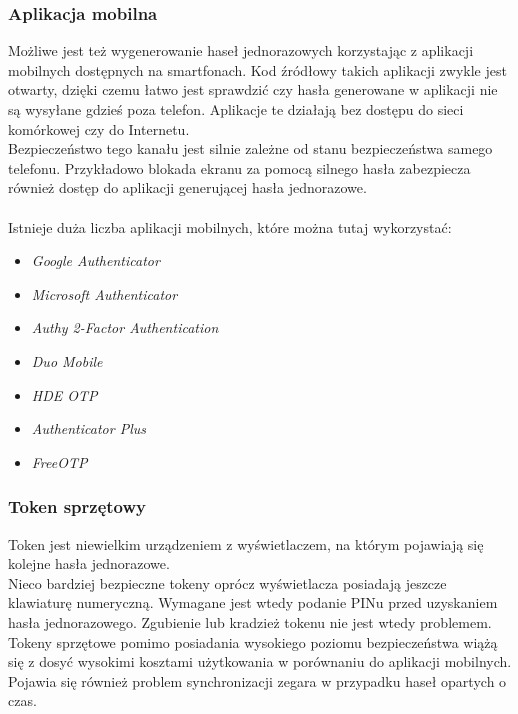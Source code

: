 \subsubsection{Aplikacja mobilna}
Możliwe jest też wygenerowanie haseł jednorazowych korzystając z aplikacji mobilnych 
dostępnych na smartfonach. Kod źródłowy takich aplikacji zwykle jest otwarty, dzięki czemu 
łatwo jest sprawdzić czy hasła generowane w aplikacji nie są wysyłane gdzieś poza telefon. 
Aplikacje te działają bez dostępu do sieci komórkowej czy do Internetu. \\
Bezpieczeństwo tego kanału jest silnie zależne od stanu bezpieczeństwa samego telefonu. 
Przykładowo blokada ekranu za pomocą silnego hasła zabezpiecza również dostęp do aplikacji generującej
hasła jednorazowe. \\ \\
Istnieje duża liczba aplikacji mobilnych, które można tutaj wykorzystać:
\begin{itemize}
	\item \textit{Google Authenticator}
	\item \textit{Microsoft Authenticator}
	\item \textit{Authy 2-Factor Authentication}
	\item \textit{Duo Mobile}
	\item \textit{HDE OTP}
	\item \textit{Authenticator Plus}
	\item \textit{FreeOTP}
\end{itemize}

\subsubsection{Token sprzętowy}
Token jest niewielkim urządzeniem z wyświetlaczem, na którym pojawiają się kolejne hasła jednorazowe. \\
Nieco bardziej bezpieczne tokeny oprócz wyświetlacza posiadają jeszcze klawiaturę numeryczną. 
Wymagane jest wtedy podanie PINu przed uzyskaniem hasła jednorazowego. 
Zgubienie lub kradzież tokenu nie jest wtedy problemem. \\
Tokeny sprzętowe pomimo posiadania wysokiego poziomu bezpieczeństwa wiążą się z dosyć wysokimi kosztami
użytkowania w porównaniu do aplikacji mobilnych. Pojawia się również problem synchronizacji zegara 
w przypadku haseł opartych o czas.

